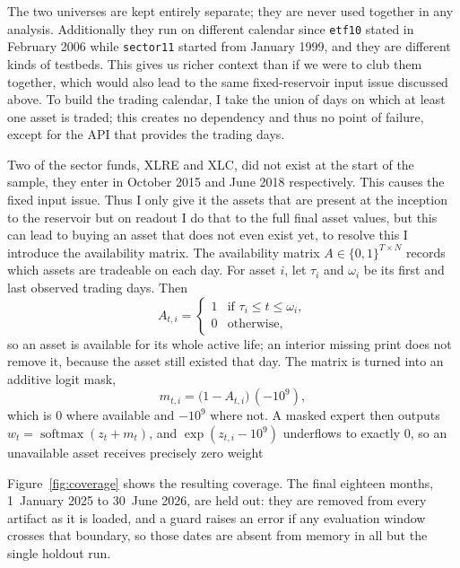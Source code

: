 The two universes are kept entirely separate; they are never used together in any analysis. Additionally they run on different calendar since  \texttt{etf10} stated in February 2006 while \texttt{sector11}
started from January 1999, and they are different kinds of testbeds. This gives us richer context than if we were to club them together, which would also lead to the same fixed-reservoir input issue discussed above. To build the trading calendar, I take the union of days on which at least one asset is traded; this creates no dependency and thus no point of failure, except for the API that provides the trading days.

Two of the sector funds, XLRE and XLC, did not exist at the start of the sample, they enter in October 2015 and June 2018 respectively. This causes the fixed input issue. Thus I only give it the assets that are present at the inception to the reservoir but on readout I do that to the full final asset values, but this can lead to buying an asset that does not even exist yet, to resolve this I introduce the availability matrix. The availability matrix $A \in \{0,1\}^{T \times N}$ records which assets are tradeable on each day. For asset $i$, let $\tau_i$ and $\omega_i$ be its first and last observed trading days. Then
\begin{equation}
  A_{t,i} =
  \begin{cases}
    1 & \text{if } \tau_i \le t \le \omega_i,\\
    0 & \text{otherwise,}
  \end{cases}
  \label{eq:availability}
\end{equation}
so an asset is available for its whole active life; an interior missing print does not remove it, because the asset still existed that day. The matrix is turned into an additive logit mask,
\begin{equation}
  m_{t,i} = \big(1 - A_{t,i}\big)\,(-10^{9}),
  \label{eq:logit-mask}
\end{equation}
which is $0$ where available and $-10^{9}$ where not. A masked expert then outputs $w_t = \operatorname{softmax}(z_t + m_t)$, and $\exp(z_{t,i} - 10^{9})$ underflows to exactly $0$, so an unavailable asset receives precisely zero weight

Figure~\ref{fig:coverage} shows the resulting coverage. The final eighteen months, 1~January 2025 to 30~June 2026, are held out: they are removed from every artifact as it is loaded, and a guard raises an error if any evaluation window crosses that boundary, so those dates are absent from memory in all but the single holdout run.

